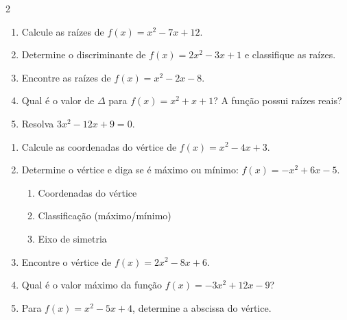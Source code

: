 \documentclass[11pt]{article}
\begin{document}
\begin{multicols}{2}

\begin{enumerate}[leftmargin=*]

\section*{Atividade}
\item Calcule as raízes de $f(x) = x^2 - 7x + 12$.

\item Determine o discriminante de $f(x) = 2x^2 - 3x + 1$ e classifique as raízes.

\item Encontre as raízes de $f(x) = x^2 - 2x - 8$.

\item Qual é o valor de $\Delta$ para $f(x) = x^2 + x + 1$? A função possui raízes reais?

\item Resolva $3x^2 - 12x + 9 = 0$.

\end{enumerate}


\begin{enumerate}[leftmargin=*, start=6]

\item Calcule as coordenadas do vértice de $f(x) = x^2 - 4x + 3$.

\item Determine o vértice e diga se é máximo ou mínimo: $f(x) = -x^2 + 6x - 5$.

\begin{enumerate}[label=\alph*)]
\item Coordenadas do vértice
\item Classificação (máximo/mínimo)
\item Eixo de simetria
\end{enumerate}

\item Encontre o vértice de $f(x) = 2x^2 - 8x + 6$.

\item Qual é o valor máximo da função $f(x) = -3x^2 + 12x - 9$?

\item Para $f(x) = x^2 - 5x + 4$, determine a abscissa do vértice.


\end{enumerate}
\end{multicols}
\end{document}
